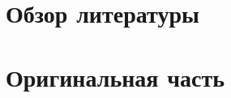 \documentclass[diploma]{nanolab2015}
\begin{document}
\sloppy



\newpage

\tableofcontents

\newpage
{}


\newpage
\chapter{Обзор литературы}


\newpage
\chapter{Оригинальная часть}


\newpage
{}


\newpage



\end{document}
